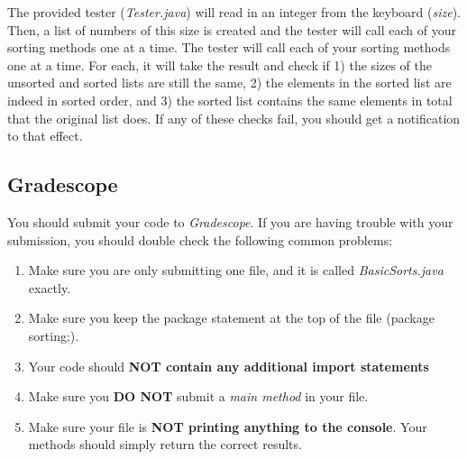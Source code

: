 \documentclass[paper=a4, fontsize=11pt, parskip=full]{scrartcl} %
\numberwithin{equation}{section} %
\numberwithin{figure}{section} %
\numberwithin{table}{section} %
\begin{document}
The provided tester (\emph{Tester.java}) will read in an integer from the keyboard (\emph{size}). Then, a list of numbers of this size is created and the tester will call each of your sorting methods one at a time. The tester will call each of your sorting methods one at a time. For each, it will take the result and check if 1) the sizes of the unsorted and sorted lists are still the same, 2) the elements in the sorted list are indeed in sorted order, and 3) the sorted list contains the same elements in total that the original list does. If any of these checks fail, you should get a notification to that effect.


\subsection{Gradescope}

You should submit your code to \emph{Gradescope}. If you are having trouble with your submission, you should double check the following common problems:

\begin{enumerate}
  \item Make sure you are only submitting one file, and it is called \emph{BasicSorts.java} exactly.
  \item Make sure you keep the package statement at the top of the file (package sorting;).
  \item Your code should \textbf{NOT contain any additional import statements}
  \item Make sure you \textbf{DO NOT} submit a \emph{main method} in your file.
  \item Make sure your file is \textbf{NOT printing anything to the console}. Your methods should simply return the correct results.
\end{enumerate}




\end{document}
